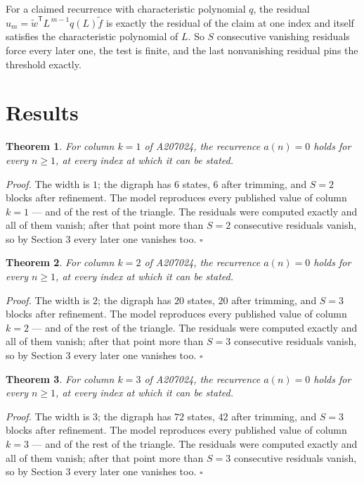 \documentclass[11pt]{article}
\newtheorem{theorem}{Theorem}
\theoremstyle{definition}
\begin{document}
For a claimed recurrence with characteristic polynomial $q$, the residual $u_m = \tilde w^{\mathsf T}L^{\,m-1}q(L)\tilde f$ is exactly the residual of the claim at one index and itself satisfies the characteristic polynomial of $L$. So $S$ consecutive vanishing residuals force every later one, the test is finite, and the last nonvanishing residual pins the threshold exactly.

\section{Results}

\begin{theorem} For column $k = 1$ of A207024, the recurrence $a(n) = 0$ holds for every $n \ge 1$, at every index at which it can be stated.\end{theorem}

{\itshape Proof.} The width is $1$; the digraph has $6$ states, $6$ after trimming, and $S = 2$ blocks after refinement. The model reproduces every published value of column $k = 1$ --- and of the rest of the triangle. The residuals were computed exactly and all of them vanish; after that point more than $S = 2$ consecutive residuals vanish, so by Section 3 every later one vanishes too. $\square$

\begin{theorem} For column $k = 2$ of A207024, the recurrence $a(n) = 0$ holds for every $n \ge 1$, at every index at which it can be stated.\end{theorem}

{\itshape Proof.} The width is $2$; the digraph has $20$ states, $20$ after trimming, and $S = 3$ blocks after refinement. The model reproduces every published value of column $k = 2$ --- and of the rest of the triangle. The residuals were computed exactly and all of them vanish; after that point more than $S = 3$ consecutive residuals vanish, so by Section 3 every later one vanishes too. $\square$

\begin{theorem} For column $k = 3$ of A207024, the recurrence $a(n) = 0$ holds for every $n \ge 1$, at every index at which it can be stated.\end{theorem}

{\itshape Proof.} The width is $3$; the digraph has $72$ states, $42$ after trimming, and $S = 3$ blocks after refinement. The model reproduces every published value of column $k = 3$ --- and of the rest of the triangle. The residuals were computed exactly and all of them vanish; after that point more than $S = 3$ consecutive residuals vanish, so by Section 3 every later one vanishes too. $\square$
\end{document}
